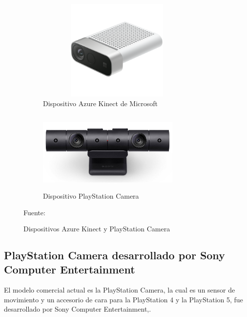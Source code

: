 \begin{figure}
	\centering
	\begin{subfigure}{.5\textwidth}
		\centering
		\includegraphics[width=8cm,height=5cm,]{./Images/azurekinect.png}
		\caption{Dispositivo Azure Kinect de Microsoft}
		\label{azureexample}
	\end{subfigure}%
	\begin{subfigure}{0.5\textwidth}
		\centering
		\includegraphics[width=7cm,height=4cm,]{./Images/cameraex.jpg}
		\caption{Dispositivo PlayStation Camera}
		\label{cameraex}
	\end{subfigure}
	\caption{Dispositivos Azure Kinect y PlayStation Camera}
	\footnotesize Fuente: \cite{cameraex} \cite{azurekinect}
	\label{AzureandCameraExample}
\end{figure}




\subsection{PlayStation Camera desarrollado por Sony Computer Entertainment}

El modelo comercial actual es la PlayStation Camera, la cual es un sensor de movimiento y un accesorio de cara para la PlayStation 4 y la PlayStation 5, fue desarrollado por Sony Computer Entertainment,.

